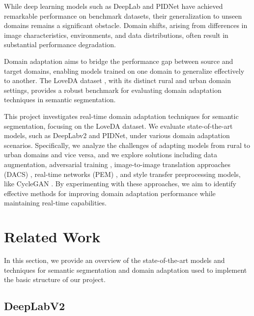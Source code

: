 \documentclass[10pt,twocolumn,letterpaper]{article}
\begin{document}
While deep learning models such as DeepLab \cite{chen2017deeplab} and PIDNet \cite{feng2021pidnet} have achieved remarkable performance on benchmark datasets, their generalization to unseen domains remains a significant obstacle. Domain shifts, arising from differences in image characteristics, environments, and data distributions, often result in substantial performance degradation.

Domain adaptation aims to bridge the performance gap between source and target domains, enabling models trained on one domain to generalize effectively to another. The LoveDA dataset \cite{wang2021loveda}, with its distinct rural and urban domain settings, provides a robust benchmark for evaluating domain adaptation techniques in semantic segmentation. 

This project investigates real-time domain adaptation techniques for semantic segmentation, focusing on the LoveDA dataset. We evaluate state-of-the-art models, such as DeepLabv2 and PIDNet, under various domain adaptation scenarios. Specifically, we analyze the challenges of adapting models from rural to urban domains and vice versa, and we explore solutions including data augmentation, adversarial training \cite{tsai2018advlearning}, image-to-image translation approaches (DACS) \cite{tranheden2021dacs}, real-time networks (PEM) \cite{cavagnero2024pem}, and style transfer preprocessing models, like CycleGAN \cite{zhu2020cyclegan}. By experimenting with these approaches, we aim to identify effective methods for improving domain adaptation performance while maintaining real-time capabilities.

\section{Related Work}
\label{sec:related}

In this section, we provide an overview of the state-of-the-art models and techniques for semantic segmentation and domain adaptation used to implement the basic structure of our project.

\subsection{DeepLabV2}
\end{document}
